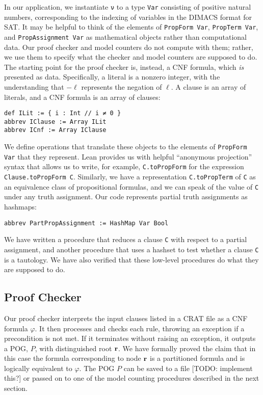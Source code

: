 In our application, we instantiate \lstinline{ν} to a type \lstinline{Var} consisting
of positive natural numbers, corresponding to the indexing of variables in the DIMACS
format for SAT. It may be helpful to think of the elements of \lstinline{PropForm Var},
\lstinline{PropTerm Var}, and \lstinline{PropAssignment Var} as mathematical objects
rather than computational data. Our proof checker and model counters do not compute
with them; rather, we use them to specify what the checker and model counters are supposed to do.
The starting point for the proof checker is, instead, a CNF formula, which \emph{is}
presented as data.
Specifically, a literal is a nonzero integer, with the understanding that $-\ell$ represents
the negation of $\ell$. A clause is an array of literals, and a CNF formula is an array
of clauses:
\begin{lstlisting}
def ILit := { i : Int // i ≠ 0 }
abbrev IClause := Array ILit
abbrev ICnf := Array IClause
\end{lstlisting}
We define operations that translate these objects to the elements of \lstinline{PropForm Var}
that they represent. Lean provides us with helpful ``anonymous projection'' syntax that allows
us to write, for example, \lstinline{C.toPropForm} for the expression
\lstinline{Clause.toPropForm C}.
Similarly, we have a representation \lstinline{C.toPropTerm}
of \lstinline{C} as an equivalence class of propositional formulas, and we can speak of the
value of \lstinline{C} under any truth assignment.
Our code represents partial truth assignments as hashmaps:
\begin{lstlisting}
abbrev PartPropAssignment := HashMap Var Bool
\end{lstlisting}
We have written a procedure that reduces a clause \lstinline{C} with respect to a partial
assignment, and another procedure that uses a hashset to test whether a clause \lstinline{C} is a
tautology.
We have also verified that these low-level procedures do what they are supposed to do.

\subsection{Proof Checker}

Our proof checker interprets the input clauses listed in a CRAT file as a CNF formula $\varphi$.
It then processes and checks each rule, throwing an exception if a precondition is not met.
If it terminates without raising an exception, it outputs a POG, $P$, with distinguished root
$\bf r$.
We have formally proved the claim that in this case the formula corresponding to node $\bf r$ is a partitioned formula and is
logically equivalent to $\varphi$.
The POG $P$ can be saved to a file [TODO: implement this?] or passed on to one of the model counting
procedures described in the next section.


